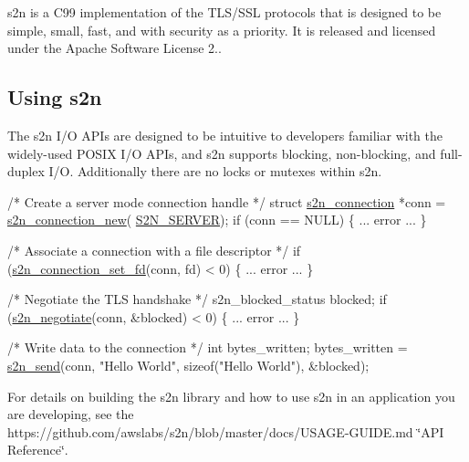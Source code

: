 

s2n is a C99 implementation of the T\+L\+S/\+S\+SL protocols that is designed to be simple, small, fast, and with security as a priority. It is released and licensed under the Apache Software License 2..

\href{https://travis-ci.org/awslabs/s2n}{\tt } \href{http://aws.amazon.com/apache-2-0/}{\tt } \href{http://www.open-std.org/jtc1/sc22/wg14/www/docs/n1256.pdf}{\tt } \href{https://github.com/awslabs/s2n/network}{\tt } \href{https://github.com/awslabs/s2n/stargazers}{\tt }

\subsection*{Using s2n}

The s2n I/O A\+P\+Is are designed to be intuitive to developers familiar with the widely-\/used P\+O\+S\+IX I/O A\+P\+Is, and s2n supports blocking, non-\/blocking, and full-\/duplex I/O. Additionally there are no locks or mutexes within s2n.


\begin{DoxyCode}
\textcolor{comment}{/* Create a server mode connection handle */}
\textcolor{keyword}{struct }\hyperlink{structs2n__connection}{s2n\_connection} *conn = \hyperlink{s2n_8h_acffb3a7098380db63bc23498482ee4b9}{s2n\_connection\_new}(
      \hyperlink{s2n_8h_a77a64e3b657f90d221c5faf99c643cdba6d8d11a87ee62316e49b1b166c2b2c52}{S2N\_SERVER});
\textcolor{keywordflow}{if} (conn == NULL) \{
    ... error ...
\}

\textcolor{comment}{/* Associate a connection with a file descriptor */}
\textcolor{keywordflow}{if} (\hyperlink{s2n_8h_a80776ecf7e726f52165cdec5e2652d1e}{s2n\_connection\_set\_fd}(conn, fd) < 0) \{
    ... error ...
\}

\textcolor{comment}{/* Negotiate the TLS handshake */}
s2n\_blocked\_status blocked;
\textcolor{keywordflow}{if} (\hyperlink{s2n_8h_a309d98d4c1adfd10c5dd62192f4c1051}{s2n\_negotiate}(conn, &blocked) < 0) \{
    ... error ...
\}

\textcolor{comment}{/* Write data to the connection */}
\textcolor{keywordtype}{int} bytes\_written;
bytes\_written = \hyperlink{s2n_8h_a6d221800840cc73c57109088dac2f467}{s2n\_send}(conn, \textcolor{stringliteral}{"Hello World"}, \textcolor{keyword}{sizeof}(\textcolor{stringliteral}{"Hello World"}), &blocked);
\end{DoxyCode}


For details on building the s2n library and how to use s2n in an application you are developing, see the https\+://github.com/awslabs/s2n/blob/master/docs/\+U\+S\+A\+G\+E-\/\+G\+U\+I\+D\+E.\+md \char`\"{}\+A\+P\+I Reference\char`\"{}.

